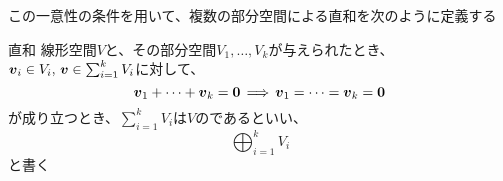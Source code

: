 \documentclass[../../../topic_linear-algebra]{subfiles}
\begin{document}
\br

この一意性の条件を用いて、複数の部分空間による直和を次のように定義する

\begin{definition*}{直和}
  線形空間$V$と、その部分空間$V_1,\ldots,V_k$が与えられたとき、$\vb*{v}_i \in V_i,\,\vb*{v} \in \sum_{i=1}^k V_i$に対して、
  \begin{equation*}
    \vb*{v}_1 + \cdots + \vb*{v}_k = \vb*{0} \, \Longrightarrow \, \vb*{v}_1 = \cdots = \vb*{v}_k = \vb*{0}
  \end{equation*}
  が成り立つとき、$\displaystyle\sum_{i=1}^{k} V_i$は$V$のであるといい、
  \begin{equation*}
    \bigoplus_{i=1}^k V_i
  \end{equation*}
  と書く
\end{definition*}
\end{document}
